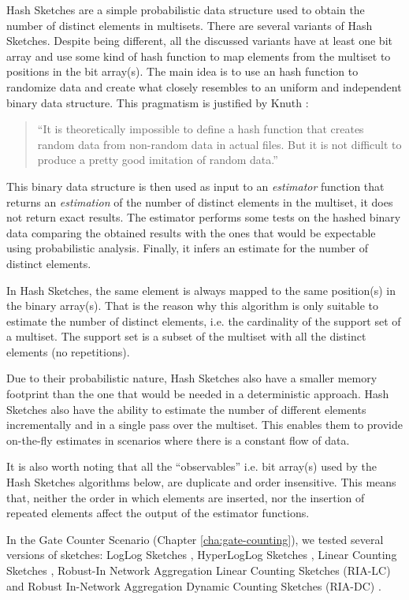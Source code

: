 Hash Sketches are a simple probabilistic data structure used to obtain
the number of distinct elements in multisets. There are several
variants of Hash Sketches. Despite being different, all the discussed
variants have at least one bit array and use some kind of
hash function to map elements from the multiset to positions in the
bit array(s). The main idea is to use an hash function to
randomize data and create what closely resembles to an uniform and
independent binary data structure. This pragmatism is justified by
Knuth \cite{knuth1998art}:
\begin{quotation}
``It is theoretically impossible to define a hash
function that creates random data from non-random data in actual
files. But it is not difficult to produce a pretty good imitation of
random data.''
\end{quotation}
This binary data structure is then used as input to an
\emph{estimator} function that returns an \emph{estimation} of the
number of distinct elements in the multiset, it does not return exact
results. The estimator performs some tests on the hashed
binary data comparing the obtained results with the ones that would be
expectable using probabilistic analysis. Finally, it infers an estimate
for the number of distinct elements.

In Hash Sketches, the same element is always mapped to the same
position(s) in the binary array(s). That is the reason why this
algorithm is only suitable to estimate the number of distinct
elements, i.e. the cardinality of the support set of a multiset. The
support set is a subset of the multiset with all the distinct elements (no
repetitions).

Due to their probabilistic nature, Hash Sketches also have a smaller
memory footprint than the one that would be needed in a deterministic
approach. Hash Sketches also have the ability to estimate the number
of different elements incrementally and in a single pass over the
multiset. This enables them to provide on-the-fly estimates in
scenarios where there is a constant flow of data.

It is also worth noting that all the ``observables'' i.e. bit
array(s) used by the Hash Sketches algorithms below, are
duplicate and order insensitive. This means that, neither the order in
which elements are inserted, nor the insertion of repeated elements
affect the output of the estimator functions.

In the Gate Counter Scenario (Chapter \ref{cha:gate-counting}), we
tested several versions of sketches: LogLog Sketches
\cite{Durand:2003tc}, HyperLogLog Sketches \cite{Fusy:2007um}, Linear
Counting Sketches \cite{Whang:1990uh}, Robust-In Network Aggregation
Linear Counting Sketches (RIA-LC)
\cite{Fan:2008wl,YaoChungFanArbeeLPChen:2010to} and Robust In-Network
Aggregation Dynamic Counting Sketches (RIA-DC)
\cite{YaoChungFanArbeeLPChen:2010to}.

